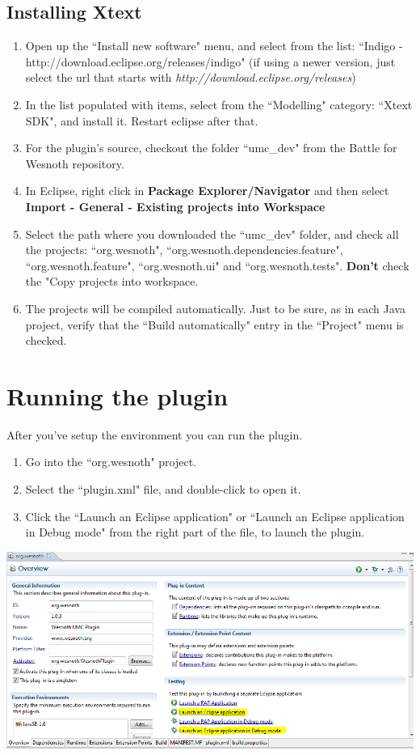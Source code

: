 \documentclass[10pt]{article}
\begin{document}
\subsection{Installing Xtext}
\begin{enumerate}
\item Open up the ``Install new software" menu, and select from the list: ``Indigo - http://download.eclipse.org/releases/indigo" (if using a newer version, just select the url that starts with \emph{http://download.eclipse.org/releases})

\item In the list populated with items, select from the ``Modelling" category: ``Xtext SDK", and install it. Restart eclipse after that.

\item For the plugin's source, checkout the folder ``umc\_dev" from
  the Battle for Wesnoth repository.

\item In Eclipse, right click in \textbf{Package Explorer/Navigator} and then select \textbf{Import - General - Existing projects into Workspace}

\item Select the path where you downloaded the ``umc\_dev" folder, and check all the projects: ``org.wesnoth", ``org.wesnoth.dependencies.feature", ``org.wesnoth.feature", ``org.wesnoth.ui" and ``org.wesnoth.tests". \textbf{Don't} check the "Copy projects into workspace.

\item The projects will be compiled automatically. Just to be sure, as in each Java project, verify that the ``Build automatically" entry in the ``Project" menu is checked.
\end{enumerate}

\section{Running the plugin}
After you've setup the environment you can run the plugin.
\begin{enumerate}
	\item Go into the ``org.wesnoth" project.
	\item Select the ``plugin.xml" file, and double-click to open it.
	\item Click the ``Launch an Eclipse application" or ``Launch an Eclipse application in Debug mode" from the right part of the file, to launch the plugin.
\end{enumerate}
	\centerline{\includegraphics[scale=0.6]{launch_plugin.png}}
\end{document}

